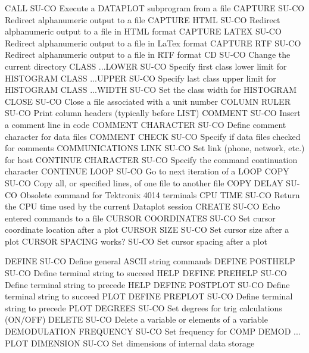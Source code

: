 CALL                        SU-CO Execute a DATAPLOT subprogram from a file
CAPTURE                     SU-CO Redirect alphanumeric output to a file
CAPTURE HTML                SU-CO Redirect alphanumeric output to a file in HTML format
CAPTURE LATEX               SU-CO Redirect alphanumeric output to a file in LaTex format
CAPTURE RTF                 SU-CO Redirect alphanumeric output to a file in RTF format
CD                          SU-CO Change the current directory
CLASS ...LOWER              SU-CO Specify first class lower limit for HISTOGRAM
CLASS ...UPPER              SU-CO Specify last class upper limit for HISTOGRAM
CLASS ...WIDTH              SU-CO Set the class width for HISTOGRAM
CLOSE                       SU-CO Close a file associated with a unit number
COLUMN RULER                SU-CO Print column headers (typically before LIST)
COMMENT                     SU-CO Insert a comment line in code
COMMENT CHARACTER           SU-CO Define comment character for data files
COMMENT CHECK               SU-CO Specify if data files checked for comments
COMMUNICATIONS LINK         SU-CO Set link (phone, network, etc.) for host
CONTINUE CHARACTER          SU-CO Specify the command continuation character
CONTINUE LOOP               SU-CO Go to next iteration of a LOOP
COPY                        SU-CO Copy all, or specified lines, of one file to another file
COPY DELAY                  SU-CO Obsolete command for Tektronix 4014 terminals
CPU TIME                    SU-CO Return the CPU time used by the current Dataplot session
CREATE                      SU-CO Echo entered commands to a file
CURSOR COORDINATES          SU-CO Set cursor coordinate location after a plot
CURSOR SIZE                 SU-CO Set cursor size after a plot
CURSOR SPACING works?       SU-CO Set cursor spacing after a plot

DEFINE                      SU-CO Define general ASCII string commands
DEFINE POSTHELP             SU-CO Define terminal string to succeed HELP
DEFINE PREHELP              SU-CO Define terminal string to precede HELP
DEFINE POSTPLOT             SU-CO Define terminal string to succeed PLOT
DEFINE PREPLOT              SU-CO Define terminal string to precede PLOT
DEGREES                     SU-CO Set degrees for trig calculations (ON/OFF)
DELETE                      SU-CO Delete a variable or elements of a variable
DEMODULATION FREQUENCY      SU-CO Set frequency for COMP DEMOD ... PLOT
DIMENSION                   SU-CO Set dimensions of internal data storage


